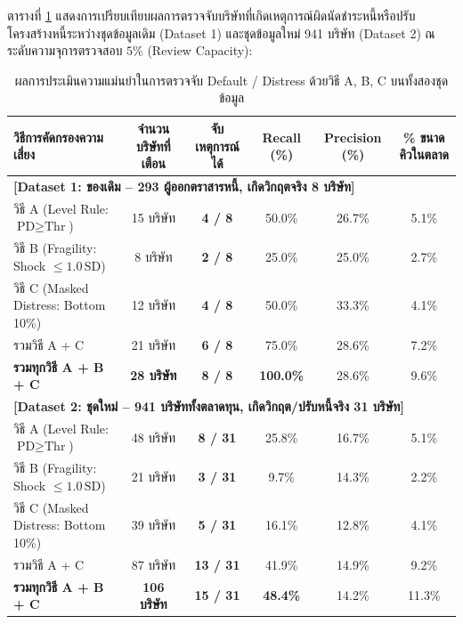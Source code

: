 \documentclass[11pt,a4paper]{article}
\begin{document}
ตารางที่ \ref{tab:abc_results} แสดงการเปรียบเทียบผลการตรวจจับบริษัทที่เกิดเหตุการณ์ผิดนัดชำระหนี้หรือปรับโครงสร้างหนี้ระหว่างชุดข้อมูลเดิม (Dataset 1) และชุดข้อมูลใหม่ 941 บริษัท (Dataset 2) ณ ระดับความจุการตรวจสอบ $5\%$ (Review Capacity):

\begin{table}[H]
\centering
\small
\renewcommand{\arraystretch}{1.25}
\begin{tabular}{lccccc}
\toprule
\textbf{วิธีการคัดกรองความเสี่ยง} & \textbf{จำนวนบริษัทที่เตือน} & \textbf{จับเหตุการณ์ได้} & \textbf{Recall (\%)} & \textbf{Precision (\%)} & \textbf{\% ขนาดคิวในตลาด} \\
\midrule
\multicolumn{6}{l}{\textbf{\textcolor{navyblue}{[Dataset 1: ของเดิม -- 293 ผู้ออกตราสารหนี้, เกิดวิกฤตจริง 8 บริษัท]}}} \\
\hline
\quad วิธี A (Level Rule: $\text{PD} \ge \text{Thr}$) & 15 บริษัท & \textbf{4 / 8} & 50.0\% & 26.7\% & 5.1\% \\
\quad วิธี B (Fragility: Shock $\le 1.0\,\text{SD}$) & 8 บริษัท & \textbf{2 / 8} & 25.0\% & 25.0\% & 2.7\% \\
\quad วิธี C (Masked Distress: Bottom 10\%) & 12 บริษัท & \textbf{4 / 8} & 50.0\% & 33.3\% & 4.1\% \\
\rowcolor{softgrey} \quad รวมวิธี A + C & 21 บริษัท & \textbf{6 / 8} & 75.0\% & 28.6\% & 7.2\% \\
\rowcolor{softgrey} \quad \textbf{รวมทุกวิธี A + B + C} & \textbf{28 บริษัท} & \textbf{8 / 8} & \textbf{100.0\%} & 28.6\% & 9.6\% \\
\midrule
\multicolumn{6}{l}{\textbf{\textcolor{navyblue}{[Dataset 2: ชุดใหม่ -- 941 บริษัททั้งตลาดทุน, เกิดวิกฤต/ปรับหนี้จริง 31 บริษัท]}}} \\
\hline
\quad วิธี A (Level Rule: $\text{PD} \ge \text{Thr}$) & 48 บริษัท & \textbf{8 / 31} & 25.8\% & 16.7\% & 5.1\% \\
\quad วิธี B (Fragility: Shock $\le 1.0\,\text{SD}$) & 21 บริษัท & \textbf{3 / 31} & 9.7\% & 14.3\% & 2.2\% \\
\quad วิธี C (Masked Distress: Bottom 10\%) & 39 บริษัท & \textbf{5 / 31} & 16.1\% & 12.8\% & 4.1\% \\
\rowcolor{softgrey} \quad รวมวิธี A + C & 87 บริษัท & \textbf{13 / 31} & 41.9\% & 14.9\% & 9.2\% \\
\rowcolor{softgrey} \quad \textbf{รวมทุกวิธี A + B + C} & \textbf{106 บริษัท} & \textbf{15 / 31} & \textbf{48.4\%} & 14.2\% & 11.3\% \\
\bottomrule
\end{tabular}
\caption{ผลการประเมินความแม่นยำในการตรวจจับ Default / Distress ด้วยวิธี A, B, C บนทั้งสองชุดข้อมูล}
\label{tab:abc_results}
\end{table}
\end{document}
